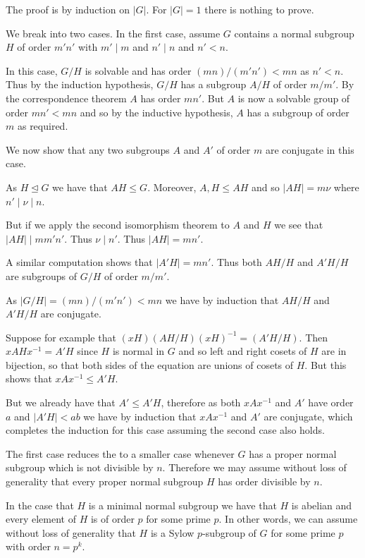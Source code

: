 \documentclass[10pt]{article}
\newenvironment{proof}[1][Proof]{\begin{trivlist}
\item[\hskip \labelsep {\itshape #1}]}{\end{trivlist}}
\begin{document}
\begin{proof}
The proof is by induction on $|G|$. For $|G| = 1$ there is nothing to prove.

We break into two cases. In the first case, assume $G$ contains a normal subgroup $H$ of order $m'n'$ with $m' \;|\; m$ and $n' \;|\; n$ and $n' < n$.

In this case, $G/H$ is solvable and has order $(mn)/(m'n') < mn$ as $n' < n$. Thus by the induction hypothesis, $G/H$ has a subgroup $A/H$ of order $m/m'$. By the correspondence theorem $A$ has order $mn'$. But $A$ is now a solvable group of order $mn' < mn$ and so by the inductive hypothesis, $A$ has a subgroup of order $m$ as required.

We now show that any two subgroups $A$ and $A'$ of order $m$ are conjugate in this case.

As $H \mathrel{\unlhd} G$ we have that $AH \leq G$. Moreover, $A, H \leq AH$ and so $|AH| = m\nu$ where $n' \;|\; \nu \;|\; n$.

But if we apply the second isomorphism theorem to $A$ and $H$ we see that $|AH| \;|\; mm'n'$. Thus $\nu \;|\; n'$. Thus $|AH| = mn'$.

A similar computation shows that $|A'H| = mn'$. Thus both $AH/H$ and $A'H/H$ are subgroups of $G/H$ of order $m/m'$.

As $|G/H| = (mn)/(m'n') < mn$ we have by induction that $AH/H$ and $A'H/H$ are conjugate.

Suppose for example that $(xH)(AH/H)(xH)^{-1} = (A'H/H)$. Then $xAHx^{-1} = A'H$ since $H$ is normal in $G$ and so left and right cosets of $H$ are in bijection, so that both sides of the equation are unions of cosets of $H$. But this shows that $xAx^{-1} \leq A'H$.

But we already have that $A' \leq A'H$, therefore as both $xAx^{-1}$ and $A'$ have order $a$ and $|A'H| < ab$ we have by induction that $xAx^{-1}$ and $A'$ are conjugate, which completes the induction for this case assuming the second case also holds.

The first case reduces the to a smaller case whenever $G$ has a proper normal subgroup which is not divisible by $n$. Therefore we may assume without loss of generality that every proper normal subgroup $H$ has order divisible by $n$.

In the case that $H$ is a minimal normal subgroup we have that $H$ is abelian and every element of $H$ is of order $p$ for some prime $p$. In other words, we can assume without loss of generality that $H$ is a Sylow $p$-subgroup of $G$ for some prime $p$ with order $n = p^k$.


\end{proof}
\end{document}
